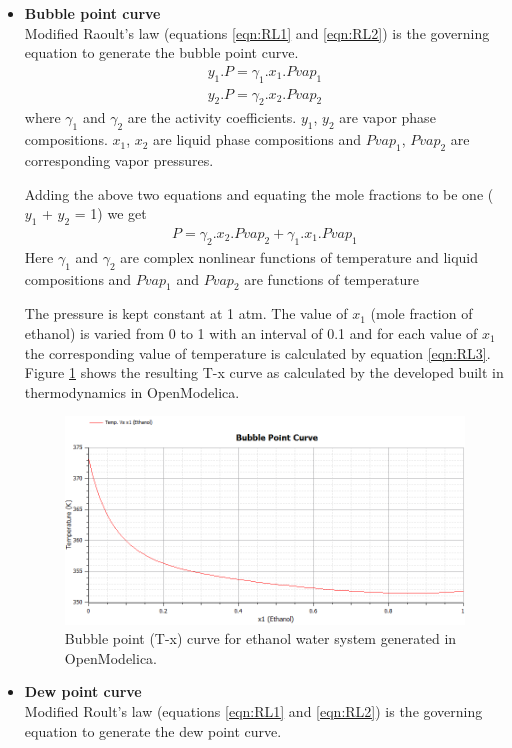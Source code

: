 \documentclass[12pt]{report}
\begin{document}
\begin{itemize}
\item {\textbf{Bubble point curve}} \\
Modified Raoult's law (equations \ref{eqn:RL1} and \ref{eqn:RL2}) is the governing equation to generate the bubble point curve.
\begin{gather}
y_1.P = \gamma_1.x_1.Pvap_1 \label{eqn:RL1}\\
y_2.P = \gamma_2.x_2.Pvap_2 \label{eqn:RL2} 
\end{gather}
where $\gamma_1$ and $\gamma_2$ are the activity coefficients. $y_1$, $y_2$ are vapor phase compositions. $x_1$, $x_2$ are liquid phase compositions and $Pvap_1$, $Pvap_2$ are corresponding vapor pressures.

Adding the above two equations and equating the mole fractions to be one ($y_1$ + $y_2$ = 1) we get
\begin{gather} 
P = \gamma_2.x_2.Pvap_2 + \gamma_1.x_1.Pvap_1 \label{eqn:RL3} 
\end{gather}
Here $\gamma_1$ and $\gamma_2$ are complex nonlinear functions of temperature and liquid compositions and $Pvap_1$ and $Pvap_2$ are functions of temperature

The pressure is kept constant at 1 atm. The value of $x_1$ (mole fraction of ethanol) is varied from 0 to 1 with an interval of 0.1 and for each value of $x_1$ the corresponding value of temperature is calculated by equation \ref{eqn:RL3}. Figure \ref{fig:BP} shows the resulting T-x curve as calculated by the developed built in thermodynamics in OpenModelica.

\begin{figure}[t]
\centering
\includegraphics[width=0.8\linewidth]{BP}
\caption{Bubble point (T-x) curve for ethanol water system generated in OpenModelica.}
\label{fig:BP}
\end{figure}

\item {\textbf{Dew point curve}} \\
Modified Roult's law (equations \ref{eqn:RL1} and \ref{eqn:RL2}) is the governing equation to generate the dew point curve.


\end{itemize}
\end{document}

